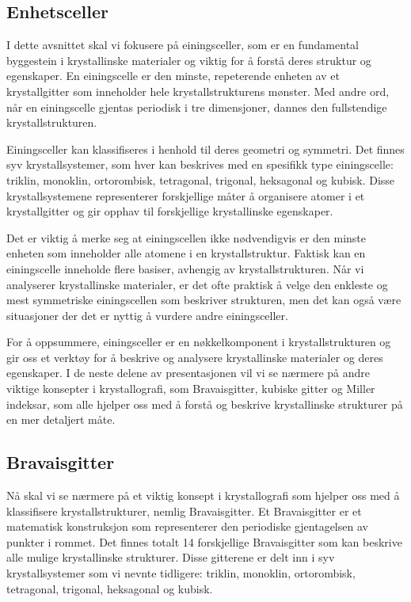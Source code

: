 \subsection*{Enhetsceller}

I dette avsnittet skal vi fokusere på einingsceller, som er en fundamental byggestein i krystallinske materialer og viktig for å forstå deres struktur og egenskaper. En einingscelle er den minste, repeterende enheten av et krystallgitter som inneholder hele krystallstrukturens mønster. Med andre ord, når en einingscelle gjentas periodisk i tre dimensjoner, dannes den fullstendige krystallstrukturen.

Einingsceller kan klassifiseres i henhold til deres geometri og symmetri. Det finnes syv krystallsystemer, som hver kan beskrives med en spesifikk type einingscelle: triklin, monoklin, ortorombisk, tetragonal, trigonal, heksagonal og kubisk. Disse krystallsystemene representerer forskjellige måter å organisere atomer i et krystallgitter og gir opphav til forskjellige krystallinske egenskaper.

Det er viktig å merke seg at einingscellen ikke nødvendigvis er den minste enheten som inneholder alle atomene i en krystallstruktur. Faktisk kan en einingscelle inneholde flere basiser, avhengig av krystallstrukturen. Når vi analyserer krystallinske materialer, er det ofte praktisk å velge den enkleste og mest symmetriske einingscellen som beskriver strukturen, men det kan også være situasjoner der det er nyttig å vurdere andre einingsceller.

For å oppsummere, einingsceller er en nøkkelkomponent i krystallstrukturen og gir oss et verktøy for å beskrive og analysere krystallinske materialer og deres egenskaper. I de neste delene av presentasjonen vil vi se nærmere på andre viktige konsepter i krystallografi, som Bravaisgitter, kubiske gitter og Miller indeksar, som alle hjelper oss med å forstå og beskrive krystallinske strukturer på en mer detaljert måte.

\subsection*{Bravaisgitter}

Nå skal vi se nærmere på et viktig konsept i krystallografi som hjelper oss med å klassifisere krystallstrukturer, nemlig Bravaisgitter. Et Bravaisgitter er et matematisk konstruksjon som representerer den periodiske gjentagelsen av punkter i rommet. Det finnes totalt 14 forskjellige Bravaisgitter som kan beskrive alle mulige krystallinske strukturer. Disse gitterene er delt inn i syv krystallsystemer som vi nevnte tidligere: triklin, monoklin, ortorombisk, tetragonal, trigonal, heksagonal og kubisk.

